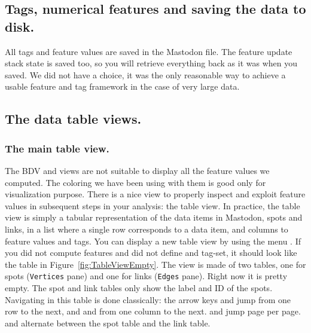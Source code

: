 \subsection{Tags, numerical features and saving the data to disk.}

All tags and feature values are saved in the Mastodon file. 
The feature update stack state is saved too, so you will retrieve everything back as it was when you saved.
We did not have a choice, it was the only reasonable way to achieve a usable feature and tag framework in the case of very large data.


\subsection{The data table views.}

\subsubsection{The main table view.}

The BDV and \TrackScheme views are not suitable to display all the feature values we computed.
The coloring we have been using with them is good only for visualization purpose. 
There is a nice view to properly inspect and exploit feature values in subsequent steps in your analysis: the table view.
In practice, the table view is simply a tabular representation of the data items in Mastodon, spots and links, in a list where a single row corresponds to a data item, and columns to feature values and tags. 
You can display a new table view by using the menu .
If you did not compute features and did not define and tag-set, it should look like the table in Figure~\ref{fig:TableViewEmpty}.
The view is made of two tables, one for spots (\texttt{Vertices} pane) and one for links (\texttt{Edges} pane).
Right now it is pretty empty. 
The spot and link tables only show the label and ID of the spots.
Navigating in this table is done classically: the arrow keys \menu{\arrowkeyup} and \keys{\arrowkeydown} jump from one row to the next, and \keys{\arrowkeyleft} and \keys{\arrowkeyright} from one column to the next.
 and  jump page per page.
 and  alternate between the spot table and the link table.

